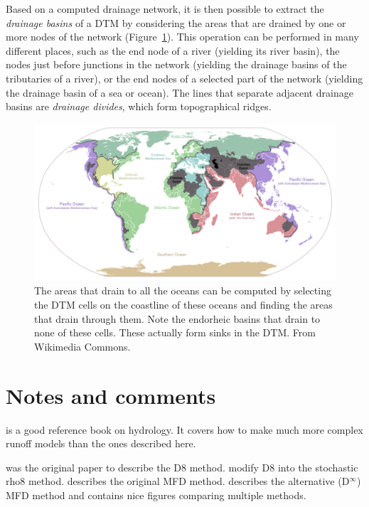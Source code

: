 Based on a computed drainage network, it is then possible to extract the \emph{drainage basins} of a DTM by considering the areas that are drained by one or more nodes of the network (Figure~\ref{fig:oceans}).
This operation can be performed in many different places, such as the end node of a river (yielding its river basin), the nodes just before junctions in the network (yielding the drainage basins of the tributaries of a river), or the end nodes of a selected part of the network (yielding the drainage basin of a sea or ocean).
The lines that separate adjacent drainage basins are \emph{drainage divides}, which form topographical ridges.

\begin{figure}[htbp]
\centering
\includegraphics[width=\linewidth]{figs/Ocean_drainage}
\caption{The areas that drain to all the oceans can be computed by selecting the DTM cells on the coastline of these oceans and finding the areas that drain through them.
Note the endorheic basins that drain to none of these cells.
These actually form sinks in the DTM\@.
From Wikimedia Commons.}%
\label{fig:oceans}
\end{figure}

%
\section{Notes and comments}

\citet{Beven12} is a good reference book on hydrology.
It covers how to make much more complex runoff models than the ones described here.

\citet{OCallaghan84} was the original paper to describe the D8 method.
\citet{Fairfield91} modify D8 into the stochastic rho8 method.
\citet{Quinn91} describes the original MFD method.
\citet{Tarborton97} describes the alternative (D\(^{\infty}\)) MFD method and contains nice figures comparing multiple methods.

